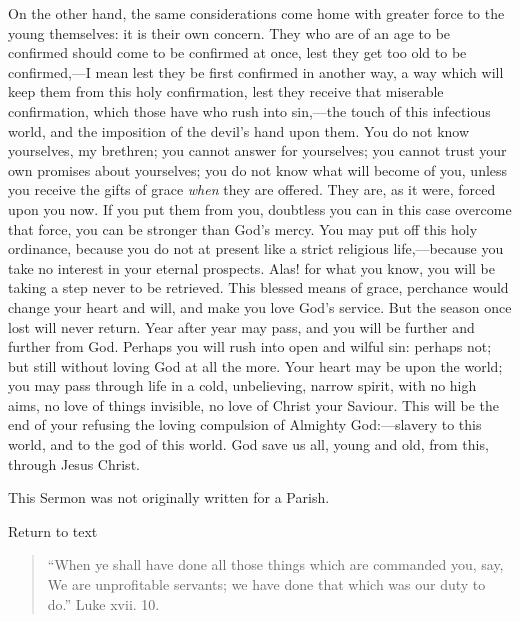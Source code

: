 On the other hand, the same considerations come home with greater
force to the young themselves: it is their own concern. They who are
of an age to be confirmed should come to be confirmed at once, lest
they get too old to be confirmed,—I mean lest they be first
confirmed in another way, a way which will keep them from this holy
confirmation, lest they receive that miserable confirmation, which
those have who rush into sin,—the touch of this infectious world,
and the imposition of the devil's hand upon them. You do not know
yourselves, my brethren; you cannot answer for yourselves; you cannot
trust your own promises about yourselves; you do not know what will
become of you, unless you receive the gifts of grace \emph{when} they
are offered. They are, as it were, forced upon you now. If you put
them from you, doubtless you can in this case overcome that force, you
can be stronger than God's mercy. You may put off this holy ordinance,
because you do not at present like a strict religious life,—because
you take no interest in your eternal prospects. Alas! for what you
know, you will be taking a step never to be retrieved. This blessed
means of grace, perchance would change your heart and will, and make
you love God's service. But the season once lost will never return.
Year after year may pass, and you will be further and further from
God. Perhaps you will rush into open and wilful sin: perhaps not; but
still without loving God at all the more. Your heart may be upon the
world; you may pass through life in a cold, unbelieving, narrow
spirit, with no high aims, no love of things invisible, no love of
Christ your Saviour. This will be the end of your refusing the loving
compulsion of Almighty God:—slavery to this world, and to the god of
this world. God save us all, young and old, from this, through Jesus
Christ.


This Sermon was not originally written for a Parish.

Return to text


\begin{quote}

``When ye shall have done all those things which are
commanded you, say, We are unprofitable servants; we have done that
which was our duty to do.'' Luke xvii. 10.

\end{quote}

